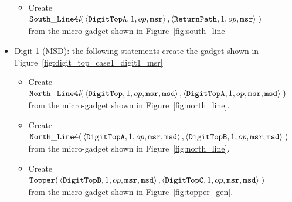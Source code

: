 \begin{itemize}
\begin{itemize}
            \item Create
            $\begin{aligned}[t]
                {\tt South\_Line4\textit{l}}(& \left\langle {\tt DigitTopA}, 1, op, {\tt msr}\right\rangle,
                                               \left\langle {\tt ReturnPath},     1, op, {\tt msr}\right\rangle \;)
            \end{aligned}$ \\ from the micro-gadget shown in Figure~\ref{fig:south_line}
        \end{itemize}
        \vspace{1cm}


        \item Digit 1 (MSD): the following statements create the gadget shown in Figure~\ref{fig:digit_top_case1_digit1_msr}
        \begin{itemize}
            \item Create
            $\begin{aligned}[t]
                {\tt North\_Line4\textit{l}}(& \left\langle {\tt DigitTop},  1, op, {\tt msr}, {\tt msd}\right\rangle,
                                               \left\langle {\tt DigitTopA}, 1, op, {\tt msr}, {\tt msd}\right\rangle \;)
            \end{aligned}$\\from the micro-gadget shown in Figure~\ref{fig:north_line}.

            \item Create $\begin{aligned}[t]
                {\tt North\_Line4}(& \left\langle {\tt DigitTopA}, 1, op, {\tt msr}, {\tt msd}\right\rangle,
                                     \left\langle {\tt DigitTopB}, 1, op, {\tt msr}, {\tt msd}\right\rangle \;)
            \end{aligned}$\\from the micro-gadget shown in Figure~\ref{fig:north_line}.

            \item Create $\begin{aligned}[t]
                {\tt Topper}(& \left\langle {\tt DigitTopB}, 1, op, {\tt msr}, {\tt msd}\right\rangle,
                               \left\langle {\tt DigitTopC}, 1, op, {\tt msr}, {\tt msd}\right\rangle \;)
            \end{aligned}$\\from the micro-gadget shown in Figure~\ref{fig:topper_gen}.


\end{itemize}
\end{itemize}
